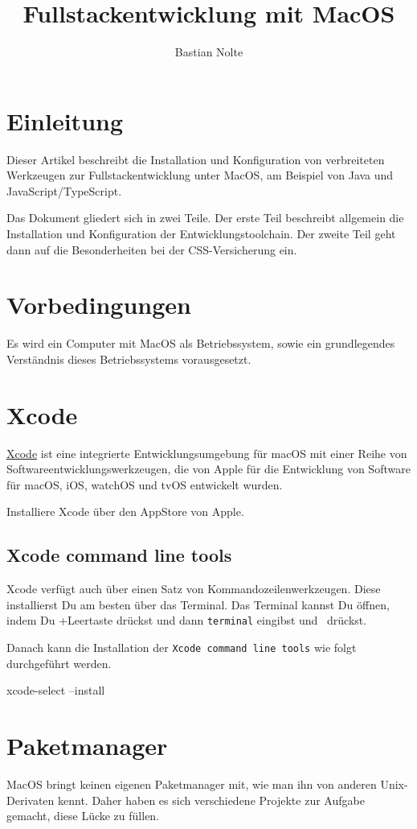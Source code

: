 \documentclass[]{article}
\title{Fullstackentwicklung mit MacOS}
\author{Bastian Nolte}
\newcommand{\code}[1]{\texttt{#1}}
\begin{document}
\maketitle
\section{Einleitung}
Dieser Artikel beschreibt die Installation und Konfiguration von verbreiteten Werkzeugen zur Fullstackentwicklung unter MacOS, am Beispiel von Java und JavaScript/TypeScript.

Das Dokument gliedert sich in zwei Teile. Der erste Teil beschreibt allgemein die Installation und Konfiguration der Entwicklungstoolchain. Der zweite Teil geht dann auf die Besonderheiten bei der CSS-Versicherung ein.

\section{Vorbedingungen}
Es wird ein Computer mit MacOS als Betriebssystem, sowie ein grundlegendes Verständnis dieses Betriebssystems vorausgesetzt.

\begingroup
\parskip=0pt
\tableofcontents
\endgroup

\section{Xcode}
\href{https://developer.apple.com/xcode/}{Xcode} ist eine integrierte Entwicklungsumgebung für macOS mit einer Reihe von Softwareentwicklungswerkzeugen, die von Apple für die Entwicklung von Software für macOS, iOS, watchOS und tvOS entwickelt wurden.

Installiere Xcode über den AppStore von Apple.
\subsection{Xcode command line tools}
Xcode verfügt auch über einen Satz von Kommandozeilenwerkzeugen. Diese installierst Du am besten über das Terminal. Das Terminal kannst Du öffnen, indem Du \cmdkey+Leertaste drückst und dann \code{terminal} eingibst und \returnkey\, drückst.

Danach kann die Installation der \code{Xcode  command line tools} wie folgt durchgeführt werden.
\begin{bashcode}
xcode-select --install
\end{bashcode}

\section{Paketmanager}
MacOS bringt keinen eigenen Paketmanager mit, wie man ihn von anderen Unix-Derivaten kennt. Daher haben es sich verschiedene Projekte zur Aufgabe gemacht, diese Lücke zu füllen.
\end{document}
